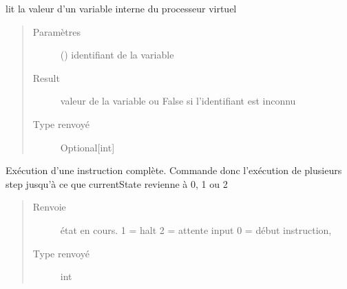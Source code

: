 \documentclass[letterpaper,10pt,french]{sphinxmanual}
\begin{document}
\begin{fulllineitems}

\begin{fulllineitems}
\label{\detokenize{executeur:executeur.Executeur.getValue}}
lit la valeur d’un variable interne du processeur virtuel
\begin{quote}\begin{description}
\item[{Paramètres}] \leavevmode
{} () \textendash{} identifiant de la variable

\item[{Result}] \leavevmode
valeur de la variable ou False si l’identifiant est inconnu

\item[{Type renvoyé}] \leavevmode
Optional{[}int{]}

\end{description}\end{quote}

\end{fulllineitems}


\begin{fulllineitems}
\label{\detokenize{executeur:executeur.Executeur.instructionStep}}
Exécution d’une instruction complète.
Commande donc l’exécution de plusieurs step jusqu’à ce que currentState revienne à 0, \sphinxhyphen{}1 ou \sphinxhyphen{}2
\begin{quote}\begin{description}
\item[{Renvoie}] \leavevmode
état en cours.
\sphinxhyphen{}1 = halt
\sphinxhyphen{}2 = attente input
0 = début instruction,

\item[{Type renvoyé}] \leavevmode
int

\end{description}\end{quote}

\end{fulllineitems}


\end{fulllineitems}
\end{document}
